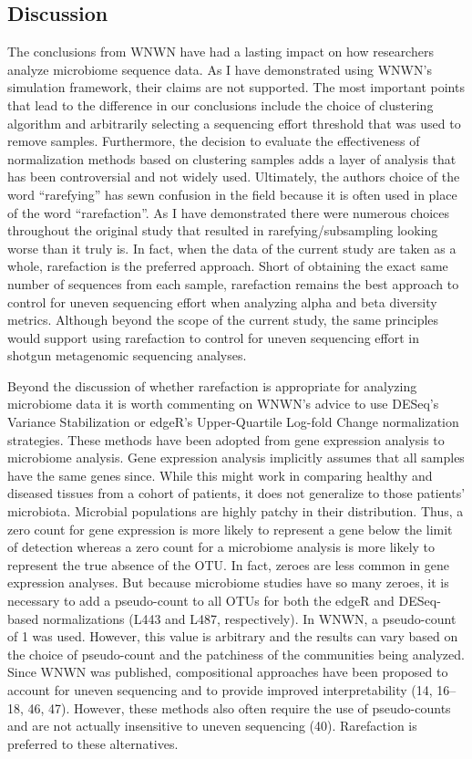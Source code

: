 \documentclass[
]{article}
\begin{document}
\hypertarget{discussion}{%
\subsection{Discussion}\label{discussion}}

The conclusions from WNWN have had a lasting impact on how researchers
analyze microbiome sequence data. As I have demonstrated using WNWN's
simulation framework, their claims are not supported. The most important
points that lead to the difference in our conclusions include the choice
of clustering algorithm and arbitrarily selecting a sequencing effort
threshold that was used to remove samples. Furthermore, the decision to
evaluate the effectiveness of normalization methods based on clustering
samples adds a layer of analysis that has been controversial and not
widely used. Ultimately, the authors choice of the word ``rarefying''
has sewn confusion in the field because it is often used in place of the
word ``rarefaction''. As I have demonstrated there were numerous choices
throughout the original study that resulted in rarefying/subsampling
looking worse than it truly is. In fact, when the data of the current
study are taken as a whole, rarefaction is the preferred approach. Short
of obtaining the exact same number of sequences from each sample,
rarefaction remains the best approach to control for uneven sequencing
effort when analyzing alpha and beta diversity metrics. Although beyond
the scope of the current study, the same principles would support using
rarefaction to control for uneven sequencing effort in shotgun
metagenomic sequencing analyses.

Beyond the discussion of whether rarefaction is appropriate for
analyzing microbiome data it is worth commenting on WNWN's advice to use
DESeq's Variance Stabilization or edgeR's Upper-Quartile Log-fold Change
normalization strategies. These methods have been adopted from gene
expression analysis to microbiome analysis. Gene expression analysis
implicitly assumes that all samples have the same genes since. While
this might work in comparing healthy and diseased tissues from a cohort
of patients, it does not generalize to those patients' microbiota.
Microbial populations are highly patchy in their distribution. Thus, a
zero count for gene expression is more likely to represent a gene below
the limit of detection whereas a zero count for a microbiome analysis is
more likely to represent the true absence of the OTU. In fact, zeroes
are less common in gene expression analyses. But because microbiome
studies have so many zeroes, it is necessary to add a pseudo-count to
all OTUs for both the edgeR and DESeq-based normalizations (L443 and
L487, respectively). In WNWN, a pseudo-count of 1 was used. However,
this value is arbitrary and the results can vary based on the choice of
pseudo-count and the patchiness of the communities being analyzed. Since
WNWN was published, compositional approaches have been proposed to
account for uneven sequencing and to provide improved interpretability
(14, 16--18, 46, 47). However, these methods also often require the use
of pseudo-counts and are not actually insensitive to uneven sequencing
(40). Rarefaction is preferred to these alternatives.
\end{document}
